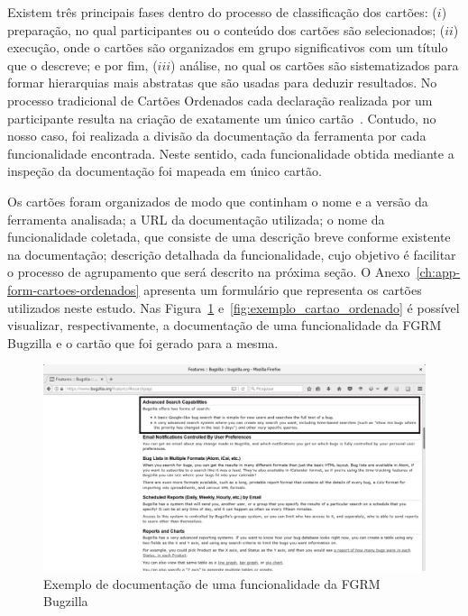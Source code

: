Existem três principais fases dentro do processo de classificação dos cartões:
($i$) preparação, no qual participantes ou o conteúdo dos cartões são selecionados;
($ii$) execução, onde o cartões são organizados em grupo significativos com um
título que o descreve; e por fim, ($iii$) análise, no qual os cartões são
sistematizados para formar hierarquias mais abstratas que são usadas para
deduzir resultados. No processo tradicional de Cartões Ordenados cada declaração
realizada por um participante resulta na criação de exatamente um único
cartão~\cite{just2008towards}. Contudo, no nosso caso, foi realizada a divisão
da documentação da ferramenta por cada funcionalidade encontrada. Neste sentido,
cada funcionalidade obtida mediante a inspeção da documentação foi mapeada em
único cartão.

Os cartões foram organizados de modo que continham o nome e a versão da
ferramenta analisada; a URL da documentação utilizada; o nome da funcionalidade
coletada, que consiste de uma descrição breve conforme existente na
documentação; descrição detalhada da funcionalidade, cujo objetivo é facilitar o
processo de agrupamento que será descrito na próxima seção. O
Anexo~\ref{ch:app-form-cartoes-ordenados} apresenta um formulário que representa
os cartões utilizados neste estudo. Nas Figura~\ref{fig:documentacao_bugzilla}
e~\ref{fig:exemplo_cartao_ordenado} é possível visualizar, respectivamente, a
documentação de uma funcionalidade da FGRM Bugzilla e o cartão que foi gerado
para a mesma.

\begin{figure}[htpb]
	\centering
	\includegraphics[width=0.8\linewidth]{./chapter-estudo-funcionalidades-fgrm/img/documentacao_bugzilla.png}
	\caption{Exemplo de documentação de uma funcionalidade da FGRM Bugzilla}
	\label{fig:documentacao_bugzilla}
\end{figure}

